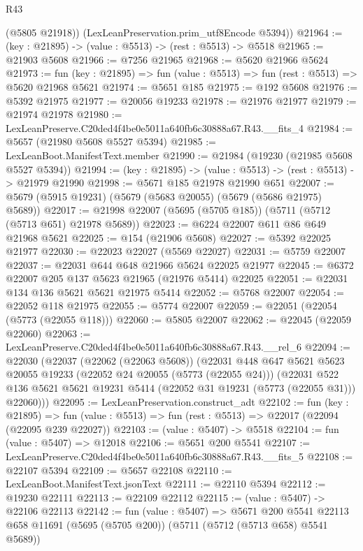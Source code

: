 \begin{lexlean}{R43}
\begin{coremodule}
        (@5805 @21918))
      (LexLeanPreservation.prim_utf8Encode @5394))
@21964 := (key : @21895) -> (value : @5513) -> (rest : @5513) -> @5518
@21965 := @21903 @5608
@21966 := @7256 @21965
@21968 := @5620 @21966 @5624
@21973 := fun (key : @21895) => fun (value : @5513) => fun (rest : @5513) => @5620 @21968 @5621
@21974 := @5651 @185
@21975 := @192 @5608
@21976 := @5392 @21975
@21977 := @20056 @19233
@21978 := @21976 @21977
@21979 := @21974 @21978
@21980 := LexLeanPreserve.C20ded4f4be0e5011a640fb6c30888a67.R43.__fits_4
@21984 := @5657 (@21980 @5608 @5527 @5394)
@21985 := LexLeanBoot.ManifestText.member
@21990 := @21984 (@19230 (@21985 @5608 @5527 @5394))
@21994 := (key : @21895) -> (value : @5513) -> (rest : @5513) -> @21979 @21990
@21998 := @5671 @185 @21978 @21990 @651
@22007 := @5679 (@5915 @19231) (@5679 (@5683 @20055) (@5679 (@5686 @21975) @5689))
@22017 := @21998 @22007 (@5695 (@5705 @185)) (@5711 (@5712 (@5713 @651) @21978 @5689))
@22023 := @6224 @22007 @611 @86 @649 @21968 @5621
@22025 := @154 (@21906 @5608)
@22027 := @5392 @22025 @21977
@22030 := @22023 @22027 (@5569 @22027)
@22031 := @5759 @22007
@22037 := @22031 @644 @648 @21966 @5624 @22025 @21977
@22045 := @6372 @22007 @205 @137 @5623 @21965 (@21976 @5414) @22025
@22051 := @22031 @134 @136 @5621 @5621 @21975 @5414
@22052 := @5768 @22007
@22054 := @22052 @118 @21975
@22055 := @5774 @22007
@22059 := @22051 (@22054 (@5773 (@22055 @118)))
@22060 := @5805 @22007
@22062 := @22045 (@22059 @22060)
@22063 := LexLeanPreserve.C20ded4f4be0e5011a640fb6c30888a67.R43.__rel_6
@22094 := @22030
    (@22037
      (@22062 (@22063 @5608))
      (@22031
        @448
        @647
        @5621
        @5623
        @20055
        @19233
        (@22052 @24 @20055 (@5773 (@22055 @24)))
        (@22031
          @522
          @136
          @5621
          @5621
          @19231
          @5414
          (@22052 @31 @19231 (@5773 (@22055 @31)))
          @22060)))
@22095 := LexLeanPreservation.construct_adt
@22102 := fun (key : @21895) =>
  fun (value : @5513) => fun (rest : @5513) => @22017 (@22094 (@22095 @239 @22027))
@22103 := (value : @5407) -> @5518
@22104 := fun (value : @5407) => @12018
@22106 := @5651 @200 @5541
@22107 := LexLeanPreserve.C20ded4f4be0e5011a640fb6c30888a67.R43.__fits_5
@22108 := @22107 @5394
@22109 := @5657 @22108
@22110 := LexLeanBoot.ManifestText.jsonText
@22111 := @22110 @5394
@22112 := @19230 @22111
@22113 := @22109 @22112
@22115 := (value : @5407) -> @22106 @22113
@22142 := fun (value : @5407) =>
  @5671
    @200
    @5541
    @22113
    @658
    @11691
    (@5695 (@5705 @200))
    (@5711 (@5712 (@5713 @658) @5541 @5689))

\end{coremodule}
\end{lexlean}
